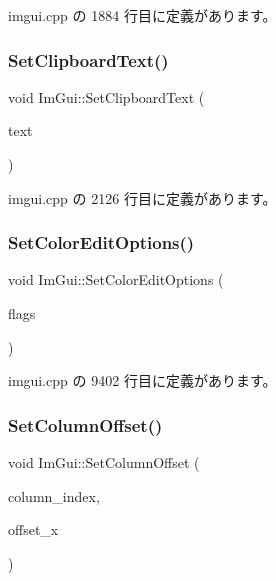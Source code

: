  imgui.\+cpp の 1884 行目に定義があります。

\mbox{\label{namespace_im_gui_aa4824a1b351c063b4aff9b9f4fb5fd4d}} 
\subsubsection{\texorpdfstring{Set\+Clipboard\+Text()}{SetClipboardText()}}
{\footnotesize\ttfamily void Im\+Gui\+::\+Set\+Clipboard\+Text (\begin{DoxyParamCaption}\item[{const char $\ast$}]{text }\end{DoxyParamCaption})}



 imgui.\+cpp の 2126 行目に定義があります。

\mbox{\label{namespace_im_gui_ac768151f2ac6c7d79b31b934cc0e9d05}} 
\subsubsection{\texorpdfstring{Set\+Color\+Edit\+Options()}{SetColorEditOptions()}}
{\footnotesize\ttfamily void Im\+Gui\+::\+Set\+Color\+Edit\+Options (\begin{DoxyParamCaption}\item[{\mbox{\hyperlink{imgui_8h_a6b2d5e95adc38f22c021252189f669c6}{Im\+Gui\+Color\+Edit\+Flags}}}]{flags }\end{DoxyParamCaption})}



 imgui.\+cpp の 9402 行目に定義があります。

\mbox{\label{namespace_im_gui_a8cc207211d6cf3f77b505e24aed4ebcc}} 
\subsubsection{\texorpdfstring{Set\+Column\+Offset()}{SetColumnOffset()}}
{\footnotesize\ttfamily void Im\+Gui\+::\+Set\+Column\+Offset (\begin{DoxyParamCaption}\item[{int}]{column\+\_\+index,  }\item[{float}]{offset\+\_\+x }\end{DoxyParamCaption})}



